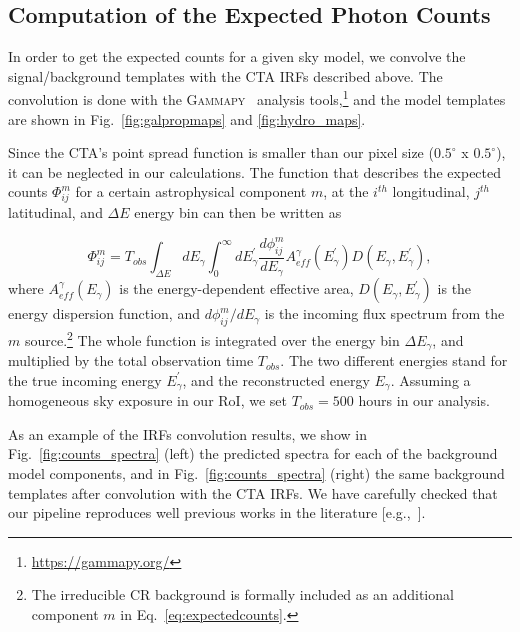 \documentclass[doublespace,nopageskip]{VTthesis} %
\begin{document}
\subsection{Computation of the Expected Photon Counts }
\label{subsec:expectedcounts}

In order to get the expected counts for a given sky model, we convolve the signal/background templates with the CTA IRFs described above. The convolution is done with the \textsc{Gammapy}~\citep{gammapy:2017,gammapy:2019} analysis tools,\footnote{\url{https://gammapy.org/}} and the model templates are shown in Fig.~\ref{fig:galpropmaps} and \ref{fig:hydro_maps}.

Since the CTA's point spread function is smaller than our pixel size ($0.5^{\circ} $ x $ 0.5^{\circ}$), it can be neglected in our calculations. The function that describes the expected counts $\Phi^m_{ij}$ for a certain astrophysical component $m$, at the $i^{th}$ longitudinal, $j^{th}$ latitudinal, and $\Delta E$ energy bin can then be written as

\begin{equation}\label{eq:expectedcounts}
    \Phi^m_{ij} = T_{obs} \int_{\Delta E} dE_{\gamma} \int_{0}^{\infty} dE^{'}_{\gamma}  \frac{d\phi^{m}_{ij}}{dE_{\gamma}} A^{\gamma}_{eff}(E^{'}_{\gamma}) D(E_{\gamma},E_{\gamma}^{'}),
\end{equation} 
where $A^{\gamma}_{eff}(E_\gamma)$ is the energy-dependent effective area, $D(E_{\gamma},E_{\gamma}^{'})$ is the energy dispersion function, and $d\phi^{m}_{ij}/dE_{\gamma}$ is the incoming flux spectrum from the $m$ source.\footnote{The irreducible CR background is formally included as an additional component $m$ in Eq.~\ref{eq:expectedcounts}.} The whole function is integrated over the energy bin $\Delta E_{\gamma}$, and multiplied by the total observation time $T_{obs}$. The two different energies stand for the true incoming energy $E_{\gamma}^{'}$, and the reconstructed energy $E_{\gamma}$. Assuming a homogeneous sky exposure in our RoI, we set $T_{obs}=500$ hours in our analysis. 

As an example of the IRFs convolution results, we show in Fig.~\ref{fig:counts_spectra} (left) the predicted spectra for each of the background model components, and in Fig.~\ref{fig:counts_spectra} (right) the same background templates after convolution with the CTA IRFs. We have carefully checked that our pipeline reproduces well previous works in the literature [e.g.,~\citep{Rinchiuso:2020skh}].
\end{document}
